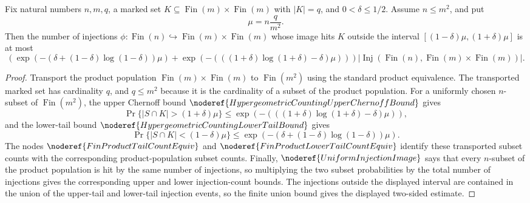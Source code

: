\begin{helper}
Fix natural numbers \(n,m,q\), a marked set
\(K\subseteq \operatorname{Fin}(m)\times\operatorname{Fin}(m)\) with
\(|K|=q\), and \(0<\delta\le 1/2\).  Assume \(n\le m^2\), and put
\[
  \mu = n\frac{q}{m^2}.
\]
Then the number of injections
\(\phi:\operatorname{Fin}(n)\hookrightarrow
\operatorname{Fin}(m)\times\operatorname{Fin}(m)\) whose image hits \(K\)
outside the interval \([(1-\delta)\mu,(1+\delta)\mu]\) is at most
\[
  \left(
    \exp\!\left(-(\delta+(1-\delta)\log(1-\delta))\mu\right)
    +
    \exp\!\left(-(((1+\delta)\log(1+\delta)-\delta)\mu)\right)
  \right)
  \left|\operatorname{Inj}\!\left(
    \operatorname{Fin}(n),
    \operatorname{Fin}(m)\times\operatorname{Fin}(m)
  \right)\right|.
\]
\end{helper}
\begin{proof}
Transport the product population
\(\operatorname{Fin}(m)\times\operatorname{Fin}(m)\) to
\(\operatorname{Fin}(m^2)\) using the standard product equivalence.  The
transported marked set has cardinality \(q\), and \(q\le m^2\) because it is
the cardinality of a subset of the product population.  For a uniformly chosen
\(n\)-subset of \(\operatorname{Fin}(m^2)\), the upper Chernoff bound
\(\noderef{HypergeometricCountingUpperChernoffBound}\) gives
\[
  \Pr\{|S\cap K|>(1+\delta)\mu\}
  \le
  \exp\!\left(-(((1+\delta)\log(1+\delta)-\delta)\mu)\right),
\]
and the lower-tail bound
\(\noderef{HypergeometricCountingLowerTailBound}\) gives
\[
  \Pr\{|S\cap K|<(1-\delta)\mu\}
  \le
  \exp\!\left(-(\delta+(1-\delta)\log(1-\delta))\mu\right).
\]
The nodes \(\noderef{FinProductTailCountEquiv}\) and
\(\noderef{FinProductLowerTailCountEquiv}\) identify these transported
subset counts with the corresponding product-population subset counts.
Finally, \(\noderef{UniformInjectionImage}\) says that every \(n\)-subset of
the product population is hit by the same number of injections, so multiplying
the two subset probabilities by the total number of injections gives the
corresponding upper and lower injection-count bounds.  The injections outside
the displayed interval are contained in the union of the upper-tail and
lower-tail injection events, so the finite union bound gives the displayed
two-sided estimate.
\end{proof}
